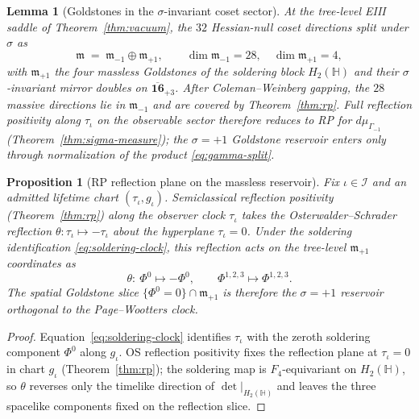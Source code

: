 \documentclass[11pt]{article}
\theoremstyle{plain}
\newtheorem{lemma}[theorem]{Lemma}
\newtheorem{proposition}[theorem]{Proposition}
\theoremstyle{definition}
\theoremstyle{remark}
\numberwithin{equation}{section}
\newcommand{\Quat}{\mathbb{H}}
\newcommand{\orderparam}{\Phi}
\begin{document}
\begin{lemma}[Goldstones in the $\sigma$-invariant coset sector]
\label{lem:goldstone-sigma}
At the tree-level EIII saddle of Theorem~\ref{thm:vacuum}, the $32$
Hessian-null coset directions split under $\sigma$ as
\begin{equation}\label{eq:goldstone-split}
  \mathfrak{m}
  \;=\;
  \mathfrak{m}_{-1}\oplus\mathfrak{m}_{+1},
  \qquad
  \dim\mathfrak{m}_{-1}=28,\quad \dim\mathfrak{m}_{+1}=4,
\end{equation}
with $\mathfrak{m}_{+1}$ the four massless Goldstones of the soldering block
$H_2(\Quat)$ and their $\sigma$-invariant mirror doubles on
$\overline{\mathbf{16}}_{+3}$. After Coleman--Weinberg gapping, the
$28$ massive directions lie in $\mathfrak{m}_{-1}$ and are covered by
Theorem~\ref{thm:rp}. Full reflection positivity along $\tau_\iota$ on the
\emph{observable} sector therefore reduces to RP for $d\mu_{\Gamma_{-1}}$
(Theorem~\ref{thm:sigma-measure}); the $\sigma=+1$ Goldstone reservoir
enters only through normalization of the product \eqref{eq:gamma-split}.
\end{lemma}

\begin{proposition}[RP reflection plane on the massless reservoir]
\label{prop:goldstone-rp-plane}
Fix $\iota\in\mathcal{I}$ and an admitted lifetime chart
$(\tau_\iota,g_\iota)$. Semiclassical reflection positivity (Theorem~\ref{thm:rp}) along the observer clock
$\tau_\iota$ takes the Osterwalder--Schrader reflection
$\theta:\tau_\iota\mapsto-\tau_\iota$ about the hyperplane $\tau_\iota=0$.
Under the soldering identification \eqref{eq:soldering-clock}, this
reflection acts on the tree-level $\mathfrak{m}_{+1}$ coordinates as
\begin{equation}\label{eq:goldstone-reflection}
  \theta:\ \orderparam^0\mapsto-\orderparam^0,
  \qquad
  \orderparam^{1,2,3}\mapsto\orderparam^{1,2,3}.
\end{equation}
The spatial Goldstone slice
$\{\orderparam^0=0\}\cap\mathfrak{m}_{+1}$ is therefore the
$\sigma=+1$ reservoir orthogonal to the Page--Wootters clock.
\end{proposition}

\begin{proof}
Equation~\eqref{eq:soldering-clock} identifies $\tau_\iota$ with the
zeroth soldering component $\orderparam^0$ along $g_\iota$. OS reflection
positivity fixes the reflection plane at $\tau_\iota=0$ in chart $g_\iota$
(Theorem~\ref{thm:rp}); the soldering map is $F_4$-equivariant on
$H_2(\Quat)$, so $\theta$ reverses only the timelike direction of
$\det|_{H_2(\Quat)}$ and leaves the three spacelike components fixed on the
reflection slice.
\end{proof}
\end{document}
